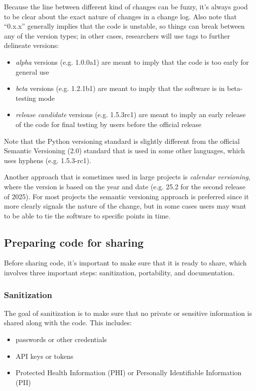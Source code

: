 Because the line between different kind of changes can be fuzzy, it's always good to be clear about the exact nature of changes in a change log.  Also note that ``0.x.x'' generally implies that the code is unstable, so things can break between any of the version types; in other cases, researchers will use tags to further delineate versions:

\begin{itemize}
\item \textit{alpha} versions (e.g. 1.0.0a1) are meant to imply that the code is too early for general use
\item \textit{beta} versions (e.g. 1.2.1b1) are meant to imply that the software is in beta-testing mode
\item \textit{release candidate} versions (e.g. 1.5.3rc1) are meant to imply an early release of the code for final testing by users before the official release
\end{itemize}

Note that the Python versioning standard is slightly different from the official Semantic Versioning (2.0) standard that is used in some other languages, which uses hyphens (e.g. 1.5.3-rc1).

Another approach that is sometimes used in large projects is \textit{calendar versioning}, where the version is based on the year and date (e.g. 25.2 for the second release of 2025).  For most projects the semantic versioning approach is preferred since it more clearly signals the nature of the change, but in some cases users may want to be able to tie the software to specific points in time.

\subsection{Preparing code for sharing}

Before sharing code, it's important to make sure that it is ready to share, which involves three important steps: sanitization, portability, and documentation.

\subsubsection{Sanitization}

The goal of sanitization is to make sure that no private or sensitive information is shared along with the code.  This includes:

\begin{itemize}
\item passwords or other credentials
\item API keys or tokens
\item Protected Health Information (PHI) or Personally Identifiable Information (PII)
\end{itemize}

